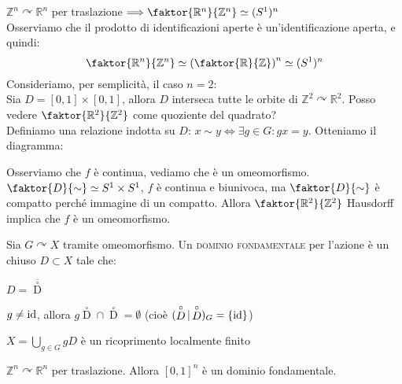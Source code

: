 \begin{ex}
$\mathbb{Z}^n \curvearrowright \mathbb{R}^n$ per traslazione $\Longrightarrow \faktor {\mathbb{R}^n}{\mathbb{Z}^n} \simeq (S^1)^n$\\
Osserviamo che il prodotto di identificazioni aperte è un'identificazione aperta, e quindi:
$$\faktor {\mathbb{R}^n}{\mathbb{Z}^n} \simeq \left(\faktor {\mathbb{R}}{\mathbb{Z}}\right) ^n \simeq (S^1)^n$$
Consideriamo, per semplicità, il caso $n=2$:\\
Sia $D=[0,1] \times [0,1]$, allora $D$ interseca tutte le orbite di $\mathbb{Z}^2 \curvearrowright \mathbb{R}^2$. Posso vedere $\faktor {\mathbb{R}^2}{\mathbb{Z}^2}$ come quoziente del quadrato?\\
Definiamo una relazione indotta su $D$: $x \sim y \Longleftrightarrow \exists g \in G : gx=y$. Otteniamo il diagramma:\\
\begin{center}
\end{center}
Osserviamo che $f$ è continua, vediamo che è un omeomorfismo. \\
$\faktor {D}{\sim} \simeq S^1 \times S^1$, $f$ è continua e biunivoca, ma $\faktor {D}{\sim}$ è compatto perché immagine di un compatto. Allora $\faktor {\mathbb{R}^2}{\mathbb{Z}^2}$ Hausdorff implica che $f$ è un omeomorfismo.
\end{ex}

\begin{defn}
Sia $G \curvearrowright X$ tramite omeomorfismo. Un \textsc{dominio fondamentale} per l'azione è un chiuso $D \subset X$ tale che:
\begin{nlist}
\item $D=\overline{\mathop D\limits ^\circ}$
\item $g \neq \operatorname{id}$, allora $g\mathop D\limits ^\circ \cap \mathop D\limits ^\circ =\emptyset$ (cioè $(\mathop D\limits ^\circ|\mathop D\limits ^\circ)_G=\{\operatorname{id}\}$)
\item $X=\displaystyle \bigcup _{g \in G} gD$ è un ricoprimento localmente finito
\end{nlist}
\end{defn}

\begin{ex}
$\mathbb{Z}^n \curvearrowright \mathbb{R}^n$ per traslazione. Allora $[0,1]^n$ è un dominio fondamentale.
\end{ex}

